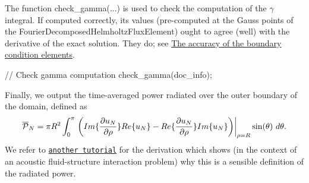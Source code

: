 The function {\ttfamily check\+\_\+gamma}(...) is used to check the computation of the $ \gamma $ integral. If computed correctly, its values (pre-\/computed at the Gauss points of the {\ttfamily Fourier\+Decomposed\+Helmholtz\+Flux\+Element}) ought to agree (well) with the derivative of the exact solution. They do; see \hyperlink{index_acc}{The accuracy of the boundary condition elements}.


\begin{DoxyCodeInclude}
 
 \textcolor{comment}{// Check gamma computation}
 check\_gamma(doc\_info);

\end{DoxyCodeInclude}


Finally, we output the time-\/averaged power radiated over the outer boundary of the domain, defined as \[ \overline{\cal P }_N = \pi R^2 \int_0^\pi \left. \bigg( Im \{\frac{\partial u_N}{\partial \rho} \} Re\{u_N \} - Re \{\frac{\partial u_N}{\partial \rho} \} Im\{u_N \} \bigg)\right|_{\rho=R} \sin(\theta) \ d\theta. \] We refer to \href{../../../fourier_decomposed_acoustic_fsi/sphere/html/index.html#appendix}{\tt another tutorial} for the derivation which shows (in the context of an acoustic fluid-\/structure interaction problem) why this is a sensible definition of the radiated power.


